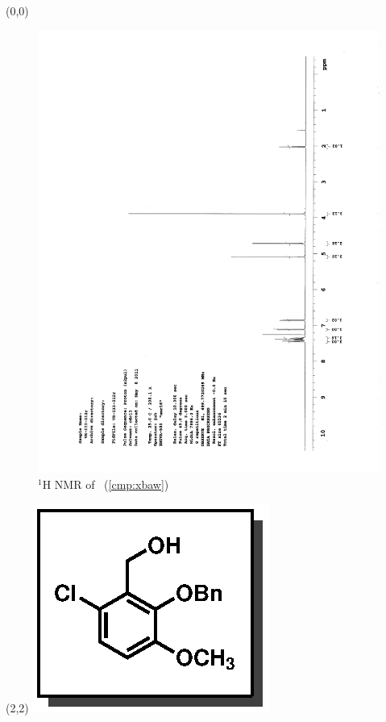 \begin{textblock}{20}(0,0)
\begin{figure}[htb]
\caption{$^1$H NMR of \CMPxbaw\ (\ref{cmp:xbaw})}
\includegraphics[scale=0.75, trim = 0mm 0mm 0mm 5mm,
clip]{chp_singlecarbon/images/nmr/xbawH}
\vspace{-100pt}
\end{figure}
\end{textblock}
\begin{textblock}{1}(2,2)
\includegraphics[scale=0.8, angle=90]{chp_singlecarbon/images/xbaw}
\end{textblock}
